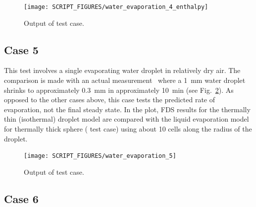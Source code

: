 \documentclass[11pt]{book}
\begin{document}
\begin{figure}[h!]
\centering
\texttt{[image: SCRIPT\_FIGURES/water\_evaporation\_4\_enthalpy]}
\caption[Sample case ]{Output of  test case.}
\label{water_evaporation_4_plot}
\end{figure}

\subsection{Case 5}
\label{water_evaporation_5}

This test involves a single evaporating water droplet in relatively dry air. The comparison is made with an actual measurement~\cite{Ranz} where a 1~mm water droplet shrinks to approximately 0.3~mm in approximately 10~min (see Fig.~\ref{water_evaporation_5_plot}). As opposed to the other cases above, this case tests the predicted rate of evaporation, not the final steady state.  In the plot, FDS results for the thermally thin (isothermal) droplet model are compared with the liquid evaporation model for thermally thick sphere ( test case) using about 10 cells along the radius of the droplet.

\begin{figure}[h!]
\centering
\texttt{[image: SCRIPT\_FIGURES/water\_evaporation\_5]}
\caption[Sample case ]{Output of  test case.}
\label{water_evaporation_5_plot}
\end{figure}

\subsection{Case 6}
\label{water_evaporation_6}
\end{document}
